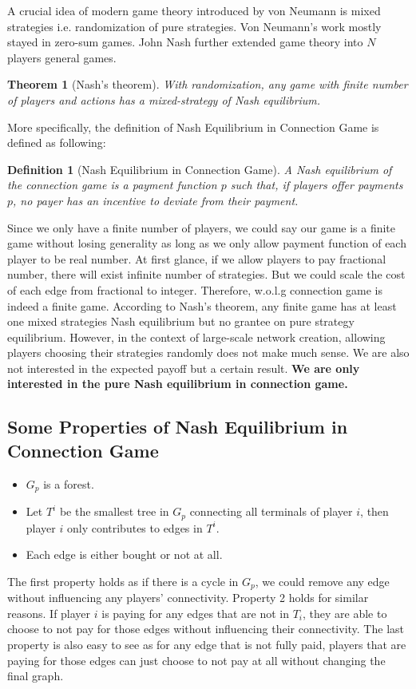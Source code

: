 \documentclass[11pt,psfig,times]{article}
\newtheorem{theorem}{Theorem}[section]
\newtheorem{definition}{Definition}[section]
\begin{document}
A crucial idea of modern game theory introduced by von Neumann is mixed strategies i.e. randomization of pure strategies. Von Neumann's work mostly stayed in zero-sum games. John Nash further extended game theory into \(N\) players general games.  
\begin{theorem}[Nash's theorem]
	With randomization, any game with finite number of players and actions has a mixed-strategy of Nash equilibrium.
\end{theorem}
More specifically, the definition of Nash Equilibrium in Connection Game is defined as following:
\begin{definition}[Nash Equilibrium in Connection Game]
	A Nash equilibrium of the connection game is a payment function $p$ such that, if players offer payments \(p\), no payer has an incentive to deviate from their payment. 
\end{definition}
Since we only have a finite number of players, we could say our game is a finite game without losing generality as long as we only allow payment function of each player to be real number. At first glance, if we allow players to pay fractional number, there will exist infinite number of strategies. But we could scale the cost of each edge from fractional to integer. Therefore, w.o.l.g connection game is indeed a finite game. According to Nash's theorem, any finite game has at least one mixed strategies Nash equilibrium but no grantee on pure strategy equilibrium. However, in the context of large-scale network creation, allowing players choosing their strategies randomly does not make much sense. We are also not interested in the expected payoff but a certain result.\textbf{ We are only interested in the pure Nash equilibrium in connection game.}

\subsection{Some Properties of Nash Equilibrium in Connection Game}

\begin{itemize}
	\item \(G_p\) is a forest.
	\item Let \(T^i\) be the smallest tree in \(G_p\) connecting all terminals of player \(i\), then player \(i\) only contributes to edges in \(T^i\).
	\item Each edge is either bought or not at all. 
\end{itemize}
The first property holds as if there is a cycle in $G_p$, we could remove any edge without influencing any players' connectivity. Property 2 holds for similar reasons. If player $i$ is paying for any edges that are not in $T_i$, they are able to choose to not pay for those edges without influencing their connectivity. The last property is also easy to see as for any edge that is not fully paid, players that are paying for those edges can just choose to not pay at all without changing the final graph. 
\end{document}
